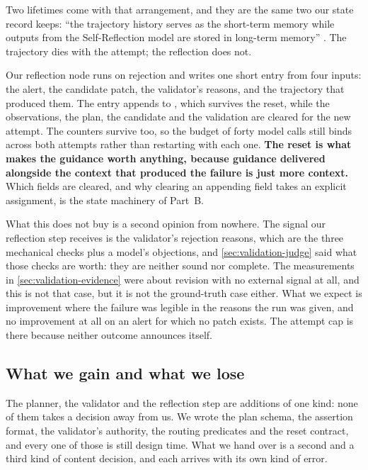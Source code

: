 Two lifetimes come with that arrangement, and they are the same two our state record keeps: ``the
trajectory history serves as the short-term memory while outputs from the Self-Reflection model are
stored in long-term memory'' \citep[\S3]{shinn2023reflexion}. The trajectory dies with the attempt;
the reflection does not.

Our reflection node runs on rejection and writes one short entry from four inputs: the alert, the
candidate patch, the validator's reasons, and the trajectory that produced them. The entry appends
to , which survives the reset, while the observations, the plan, the candidate
and the validation are cleared for the new attempt. The counters survive too, so the budget of forty
model calls still binds across both attempts rather than restarting with each one.
\textbf{The reset is what makes the guidance worth anything, because guidance delivered alongside
the context that produced the failure is just more context.} Which fields are cleared, and why
clearing an appending field takes an explicit assignment, is the state machinery of Part~B.

What this does not buy is a second opinion from nowhere. The signal our reflection step receives is
the validator's rejection reasons, which are the three mechanical checks plus a model's objections,
and \cref{sec:validation-judge} said what those checks are worth: they are neither sound nor
complete. The measurements in \cref{sec:validation-evidence} were about revision with no external
signal at all, and this is not that case, but it is not the ground-truth case either. What we expect
is improvement where the failure was legible in the reasons the run was given, and no improvement at
all on an alert for which no patch exists. The attempt cap is there because neither outcome
announces itself.

\subsection{What we gain and what we lose}
\label{sec:planning-tradeoff}
\label{sec:validation-tradeoff}

The planner, the validator and the reflection step are additions of one kind: none of them takes a
decision away from us. We wrote the plan schema, the assertion format, the validator's authority,
the routing predicates and the reset contract, and every one of those is still design time. What we
hand over is a second and a third kind of content decision, and each arrives with its own kind of
error.

